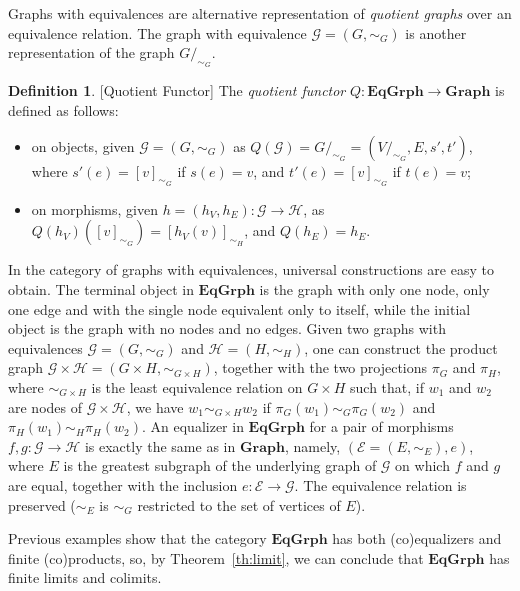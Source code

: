 \documentclass[a4paper, twoside,openright]{report}
\theoremstyle{plain}
\theoremstyle{definition}
\newtheorem{definition}[theorem]{Definition}
\begin{document}

Graphs with equivalences are alternative representation of \emph{quotient graphs} over an equivalence relation. The graph with equivalence $\mathcal{G} = (G, \sim_G)$ is another representation of the graph $G/_{\sim_G}$.

\begin{definition}\label{def:quot_func}[Quotient Functor]
    The \emph{quotient functor} $Q: \mathbf{EqGrph} \rightarrow \mathbf{Graph}$ is defined as follows:
    \begin{itemize}
        \item on objects, given $\mathcal{G}=(G, \sim_{G})$ as $Q(\mathcal{G}) = G/_{\sim_G} = (V/_{\sim_G}, E, s', t')$, where $s'(e) = [v]_{\sim_G}$ if $s(e) = v$, and $t'(e) = [v]_{\sim_G}$ if $t(e) = v$;
        \item on morphisms, given $h = (h_V, h_E): \mathcal{G \rightarrow H}$, as $Q(h_V)([v]_{\sim_G}) = [h_V(v)]_{\sim_H}$, and $Q(h_E) = h_E$.
    \end{itemize}
\end{definition}

In the category of graphs with equivalences, universal constructions are easy to obtain. 
The terminal object in $\mathbf{EqGrph}$ is the graph with only one node, only one edge and with the single node equivalent only to itself, while the initial object is the graph with no nodes and no edges.
Given two graphs with equivalences $\mathcal{G} = (G, \sim_G) $ and $\mathcal{H} = (H, \sim_{H})$, one can construct the product graph $\mathcal{G \times H} = (G \times H, \sim_{G \times H})$, together with the two projections $\pi_G$ and $\pi_H$,  where $\sim_{G \times H}$ is the least equivalence relation on $G \times H$ such that, if $w_1$ and $w_2$ are nodes of $\mathcal{G \times H}$, we have $w_1 \sim_{G \times H} w_2$ if $\pi_G(w_1) \sim_G \pi_G(w_2)$ and $\pi_H(w_1) \sim_H \pi_H(w_2)$.
An equalizer in $\mathbf{EqGrph}$ for a pair of morphisms $f, g: \mathcal{G \rightarrow H}$ is exactly the same as in $\mathbf{Graph}$, namely, $(\mathcal{E} = (E, \sim_E), e)$, where $E$ is the greatest subgraph of the underlying graph of $\mathcal{G}$ on which $f$ and $g$ are equal, together with the inclusion $e: \mathcal{E \rightarrow G}$. The equivalence relation is preserved ($\sim_E$ is $\sim_G$ restricted to the set of vertices of $E$).

Previous examples show that the category $\mathbf{EqGrph}$ has both (co)equalizers and finite (co)products, so, by Theorem~\ref{th:limit}, we can conclude that $\mathbf{EqGrph}$ has finite limits and colimits.
\end{document}
